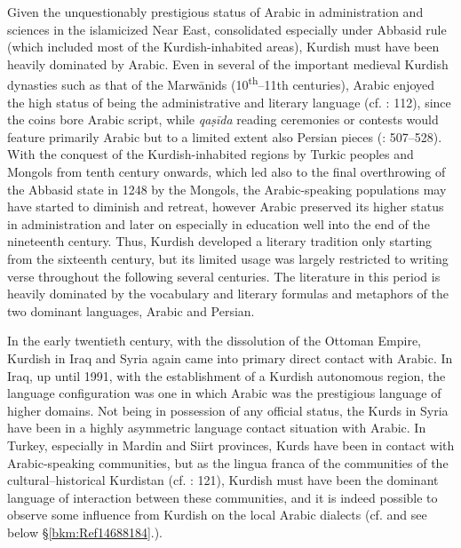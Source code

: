 \documentclass[output=paper]{langsci/langscibook}
\begin{document}
Given the unquestionably prestigious status of Arabic in administration and sciences in the islamicized Near East, consolidated especially under Abbasid rule (which included most of the Kurdish-inhabited areas), Kurdish must have been heavily dominated by Arabic. Even in several of the important medieval Kurdish dynasties such as that of the Marwānids (10\textsuperscript{th}–11th centuries), Arabic enjoyed the high status of being the administrative and literary language (cf. \citealt{James2007}: 112), since the coins bore Arabic script, while \textit{qaṣīda} reading ceremonies or contests would feature primarily Arabic but to a limited extent also Persian pieces (\citealt{Ripper2012}: 507–528). With the conquest of the Kurdish-inhabited regions by Turkic peoples and Mongols from tenth century onwards, which led also to the final overthrowing of the Abbasid state in 1248 by the Mongols, the Arabic-speaking populations may have started to diminish and retreat, however Arabic preserved its higher status in administration and later on especially in education well into the end of the nineteenth century. Thus, Kurdish developed a literary tradition only starting from the sixteenth century, but its limited usage was largely restricted to writing verse throughout the following several centuries. The literature in this period is heavily dominated by the vocabulary and literary formulas and metaphors of the two dominant languages, Arabic and Persian. 

In the early twentieth century, with the dissolution of the Ottoman Empire, Kurdish in Iraq and Syria again came into primary direct contact with Arabic. In Iraq, up until 1991, with the establishment of a Kurdish autonomous region, the language configuration was one in which Arabic was the prestigious language of higher domains. Not being in possession of any official status, the Kurds in Syria have been in a highly asymmetric language contact situation with Arabic. In Turkey, especially in Mardin and Siirt provinces, Kurds have been in contact with Arabic-speaking communities, but as the lingua franca of the communities of the cultural–historical Kurdistan (cf. \citealt{Edwards1851}: 121), Kurdish must have been the dominant language of interaction between these communities, and it is indeed possible to observe some influence from Kurdish on the local Arabic dialects (cf. \citep{Jastrow2011} and see below §\ref{bkm:Ref14688184}.). 
\end{document}

